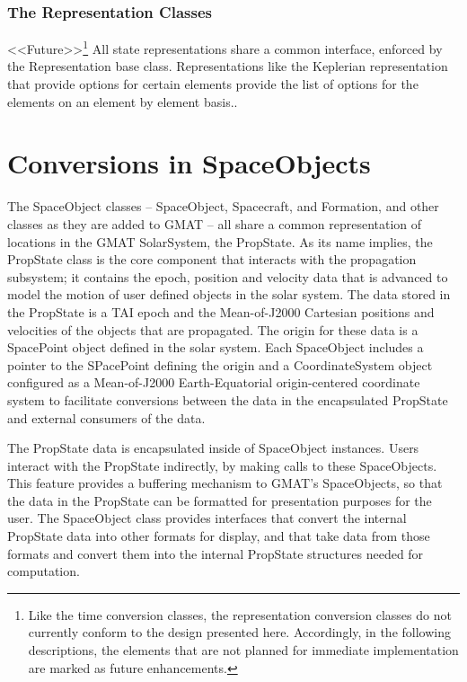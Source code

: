 \subsubsection{The Representation Classes}

<<Future>>\footnote{Like the time conversion classes, the representation conversion classes
do not currently conform to the design presented here.  Accordingly, in the following descriptions,
the elements that are not planned for immediate implementation are marked as future enhancements.}
All state representations share a common interface, enforced by the Representation base class.
Representations like the Keplerian representation that provide options for certain elements provide
the list of options for the elements on an element by element basis..

\section{\label{section:SpaceObjectConversions}Conversions in SpaceObjects}

The SpaceObject classes -- SpaceObject, Spacecraft, and Formation, and other classes as they are
added to GMAT -- all share a common representation of locations in the GMAT SolarSystem, the
PropState.  As its name implies, the PropState class is the core component that interacts with the
propagation subsystem; it contains the epoch, position and velocity data that is advanced to model
the motion of user defined objects in the solar system.  The data stored in the PropState is a TAI
epoch and the Mean-of-J2000 Cartesian positions and velocities of the objects that are propagated.
The origin for these data is a SpacePoint object defined in the solar system.  Each SpaceObject
includes a pointer to the SPacePoint defining the origin and a CoordinateSystem object configured as
a Mean-of-J2000 Earth-Equatorial origin-centered coordinate system to facilitate conversions
between the data in the encapsulated PropState and external consumers of the data.

The PropState data is encapsulated inside of SpaceObject instances.  Users interact with the
PropState indirectly, by making calls to these SpaceObjects.  This feature provides a buffering
mechanism to GMAT's SpaceObjects, so that the data in the PropState can be formatted for
presentation purposes for the user.  The SpaceObject class provides interfaces that convert the
internal PropState data into other formats for display, and that take data from those formats and
convert them into the internal PropState structures needed for computation.


